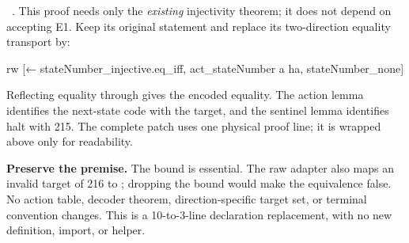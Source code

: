 \ . This proof needs only the \emph{existing} injectivity theorem; it does not depend on accepting E1. Keep its original statement and replace its two-direction equality transport by:

\begin{Lean}
  rw [← stateNumber_injective.eq_iff,
    act_stateNumber a ha, stateNumber_none]
\end{Lean}

Reflecting equality through  gives the encoded equality. The action lemma identifies the next-state code with the target, and the sentinel lemma identifies halt with 215. The complete patch uses one physical proof line; it is wrapped above only for readability.

\textbf{Preserve the premise.} The bound  is essential. The raw adapter also maps an invalid target of 216 to ; dropping the bound would make the equivalence false. No action table, decoder theorem, direction-specific target set, or terminal convention changes. This is a 10-to-3-line declaration replacement, with no new definition, import, or helper.
